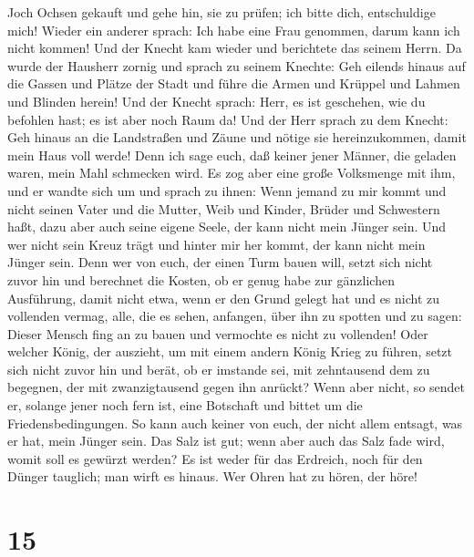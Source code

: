 Joch Ochsen gekauft und gehe hin, sie zu prüfen; ich bitte dich,
entschuldige mich!  Wieder ein anderer sprach: Ich habe
eine Frau genommen, darum kann ich nicht kommen!  Und der
Knecht kam wieder und berichtete das seinem Herrn. Da wurde der Hausherr
zornig und sprach zu seinem Knechte: Geh eilends hinaus auf die Gassen
und Plätze der Stadt und führe die Armen und Krüppel und Lahmen und
Blinden herein!  Und der Knecht sprach: Herr, es ist
geschehen, wie du befohlen hast; es ist aber noch Raum da!
 Und der Herr sprach zu dem Knecht: Geh hinaus an die
Landstraßen und Zäune und nötige sie hereinzukommen, damit mein Haus
voll werde!  Denn ich sage euch, daß keiner jener Männer,
die geladen waren, mein Mahl schmecken wird.  Es zog aber
eine große Volksmenge mit ihm, und er wandte sich um und sprach zu
ihnen:  Wenn jemand zu mir kommt und nicht seinen Vater
und die Mutter, Weib und Kinder, Brüder und Schwestern haßt, dazu aber
auch seine eigene Seele, der kann nicht mein Jünger sein.
 Und wer nicht sein Kreuz trägt und hinter mir her kommt,
der kann nicht mein Jünger sein.  Denn wer von euch, der
einen Turm bauen will, setzt sich nicht zuvor hin und berechnet die
Kosten, ob er genug habe zur gänzlichen Ausführung, 
damit nicht etwa, wenn er den Grund gelegt hat und es nicht zu vollenden
vermag, alle, die es sehen, anfangen, über ihn zu spotten
 und zu sagen: Dieser Mensch fing an zu bauen und
vermochte es nicht zu vollenden!  Oder welcher König, der
auszieht, um mit einem andern König Krieg zu führen, setzt sich nicht
zuvor hin und berät, ob er imstande sei, mit zehntausend dem zu
begegnen, der mit zwanzigtausend gegen ihn anrückt?  Wenn
aber nicht, so sendet er, solange jener noch fern ist, eine Botschaft
und bittet um die Friedensbedingungen.  So kann auch
keiner von euch, der nicht allem entsagt, was er hat, mein Jünger sein.
 Das Salz ist gut; wenn aber auch das Salz fade wird,
womit soll es gewürzt werden?  Es ist weder für das
Erdreich, noch für den Dünger tauglich; man wirft es hinaus. Wer Ohren
hat zu hören, der höre!

\hypertarget{section-14}{%
\section{15}\label{section-14}}

